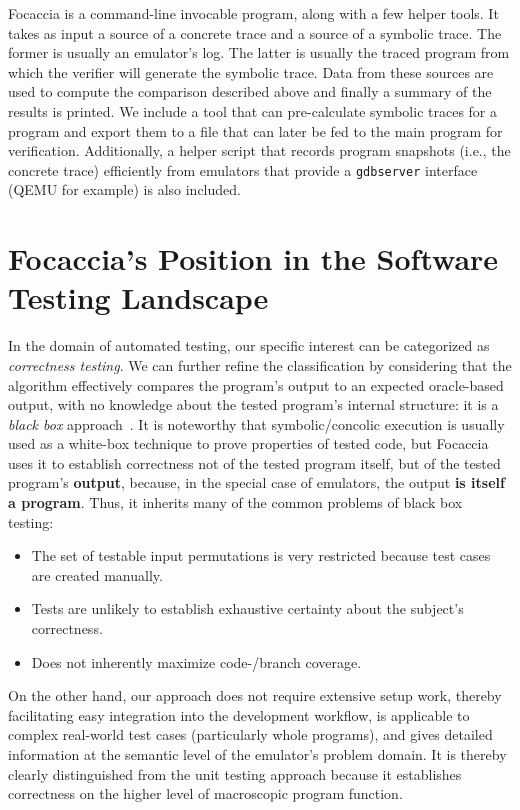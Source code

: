 Focaccia is a command-line invocable program, along with a few helper tools. It takes as input a source of a concrete
trace and a source of a symbolic trace. The former is usually an emulator's log. The latter is usually the traced
program from which the verifier will generate the symbolic trace. Data from these sources are used to compute the
comparison described above and finally a summary of the results is printed. We include a tool that can pre-calculate
symbolic traces for a program and export them to a file that can later be fed to the main program for verification.
Additionally, a helper script that records program snapshots (i.e., the concrete trace) efficiently from emulators that
provide a \texttt{gdbserver} interface~\cite{Manpage2024Gdbserver} (QEMU for example) is also included.

\section{Focaccia's Position in the Software Testing Landscape}

In the domain of automated testing, our specific interest can be categorized as \textit{correctness testing}. We can
further refine the classification by considering that the algorithm effectively compares the program's output to an
expected oracle-based output, with no knowledge about the tested program's internal structure: it is a \textit{black
box} approach~\cite{sawant2012software}. It is noteworthy that symbolic/concolic execution is usually used as a
white-box technique to prove properties of tested code, but Focaccia uses it to establish correctness not of the tested
program itself, but of the tested program's \textbf{output}, because, in the special case of emulators, the output
\textbf{is itself a program}. Thus, it inherits many of the common problems of black box testing:

\begin{itemize}
    \item The set of testable input permutations is very restricted because test cases are created manually.
    \item Tests are unlikely to establish exhaustive certainty about the subject's correctness.
    \item Does not inherently maximize code-/branch coverage.
\end{itemize}

On the other hand, our approach does not require extensive setup work, thereby facilitating easy integration into the
development workflow, is applicable to complex real-world test cases (particularly whole programs), and gives detailed
information at the semantic level of the emulator's problem domain. It is thereby clearly distinguished from the unit
testing approach because it establishes correctness on the higher level of macroscopic program function.

